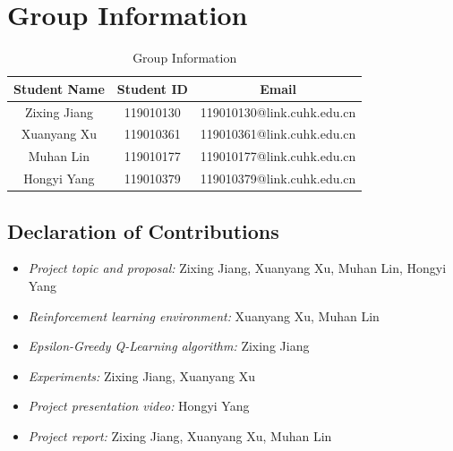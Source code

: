 \documentclass[10pt,a4paper]{article}
\begin{document}
	\section{Group Information}
	\begin{table}[H]
		\centering
		\begin{tabular}{|c|c|c|}
			\hline
			\textbf{Student Name} & \textbf{Student ID} & \textbf{Email}\\ 
			\hline
			Zixing Jiang & 119010130 & 119010130@link.cuhk.edu.cn\\ 
			\hline
			Xuanyang Xu & 119010361 & 119010361@link.cuhk.edu.cn\\  
			\hline
			Muhan Lin & 119010177 & 119010177@link.cuhk.edu.cn\\ 
			\hline
			Hongyi Yang & 119010379 & 119010379@link.cuhk.edu.cn\\ 
			\hline
		\end{tabular}
		\caption{Group Information} 
		\label{tab:group}
	\end{table}
	\subsection*{Declaration of Contributions}
	\begin{itemize}
		\item \textit{Project topic and proposal:} Zixing Jiang, Xuanyang Xu, Muhan Lin, Hongyi Yang
		\item \textit{Reinforcement learning environment:} Xuanyang Xu, Muhan Lin
		\item \textit{Epsilon-Greedy Q-Learning algorithm:} Zixing Jiang
		\item \textit{Experiments:} Zixing Jiang, Xuanyang Xu
		\item \textit{Project presentation video:} Hongyi Yang
		\item \textit{Project report:} Zixing Jiang, Xuanyang Xu, Muhan Lin
	\end{itemize}
\end{document}
